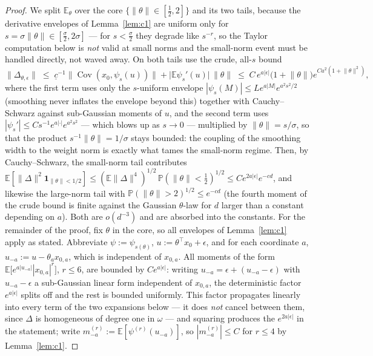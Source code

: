 \documentclass[11pt]{article}
\theoremstyle{remark}
\newcommand{\E}{\mathbb{E}}
\newcommand{\Cov}{\operatorname{Cov}}
\begin{document}
\begin{proof}
We split $\E_\theta$ over the core $\{\lVert\theta\rVert \in [\tfrac12, 2]\}$ and its two tails, because the derivative envelopes of Lemma~\ref{lem:c1} are uniform only for $s = \sigma\lVert\theta\rVert \in [\tfrac\sigma2, 2\sigma]$ --- for $s < \tfrac\sigma2$ they degrade like $s^{-r}$, so the Taylor computation below is \emph{not} valid at small norms and the small-norm event must be handled directly, not waved away. On both tails use the crude, all-$s$ bound
\[
\lVert\Delta_{\theta,\epsilon}\rVert \;\le\; \underline c^{-1}\big\lVert\Cov(x_0, \psi_s(u))\big\rVert + \big|\E\psi_s'(u)\big|\,\lVert\theta\rVert
\;\le\; C\,e^{a|\epsilon|}\big(1 + \lVert\theta\rVert\big)e^{Ca^2(1+\lVert\theta\rVert^2)} ,
\]
where the first term uses only the $s$-uniform envelope $|\psi_s(M)| \le Le^{a|M|}e^{a^2s^2/2}$ (smoothing never inflates the envelope beyond this) together with Cauchy--Schwarz against sub-Gaussian moments of $u$, and the second term uses $|\psi_s'| \le Cs^{-1}e^{a|\cdot|}e^{a^2s^2}$ --- which blows up as $s \to 0$ --- multiplied by $\lVert\theta\rVert = s/\sigma$, so that the product $s^{-1}\lVert\theta\rVert = 1/\sigma$ stays bounded: the coupling of the smoothing width to the weight norm is exactly what tames the small-norm regime. Then, by Cauchy--Schwarz, the small-norm tail contributes $\E[\lVert\Delta\rVert^2\mathbf 1_{\lVert\theta\rVert<1/2}] \le (\E\lVert\Delta\rVert^4)^{1/2}\,\mathbb P(\lVert\theta\rVert < \tfrac12)^{1/2} \le Ce^{2a|\epsilon|}e^{-cd}$, and likewise the large-norm tail with $\mathbb P(\lVert\theta\rVert > 2)^{1/2} \le e^{-cd}$ (the fourth moment of the crude bound is finite against the Gaussian $\theta$-law for $d$ larger than a constant depending on $a$). Both are $o(d^{-3})$ and are absorbed into the constants. For the remainder of the proof, fix $\theta$ in the core, so all envelopes of Lemma~\ref{lem:c1} apply as stated. Abbreviate $\psi := \psi_{s(\theta)}$, $u := \theta^\top x_0 + \epsilon$, and for each coordinate $a$, $u_{-a} := u - \theta_a x_{0,a}$, which is independent of $x_{0,a}$. All moments of the form $\E\big[e^{a|u_{-a}|}|x_{0,a}|^r\big]$, $r \le 6$, are bounded by $Ce^{a|\epsilon|}$: writing $u_{-a} = \epsilon + (u_{-a} - \epsilon)$ with $u_{-a} - \epsilon$ a sub-Gaussian linear form independent of $x_{0,a}$, the deterministic factor $e^{a|\epsilon|}$ splits off and the rest is bounded uniformly. This factor propagates linearly into every term of the two expansions below --- it does \emph{not} cancel between them, since $\Delta$ is homogeneous of degree one in $\omega$ --- and squaring produces the $e^{2a|\epsilon|}$ in the statement; write $m^{(r)}_{-a} := \E[\psi^{(r)}(u_{-a})]$, so $|m^{(r)}_{-a}| \le C$ for $r \le 4$ by Lemma~\ref{lem:c1}.


\end{proof}
\end{document}
